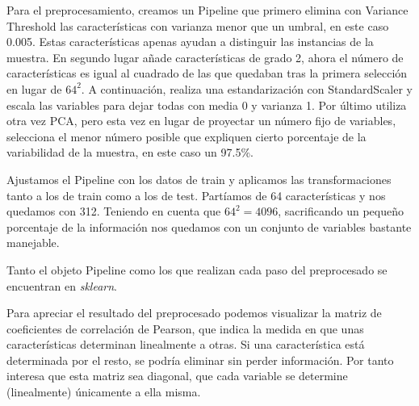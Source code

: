 \documentclass[a4]{article}
\begin{document}
Para el preprocesamiento, creamos un Pipeline que primero elimina con
Variance Threshold las características con varianza menor que un
umbral, en este caso 0.005. Estas características apenas ayudan a
distinguir las instancias de la muestra. En segundo lugar añade
características de grado 2, ahora el número de características es
igual al cuadrado de las que quedaban tras la primera selección en
lugar de $64^2$. A continuación, realiza una estandarización con
StandardScaler y escala las variables para dejar todas con media 0 y
varianza 1. Por último utiliza otra vez PCA, pero esta vez en lugar de
proyectar un número fijo de variables, selecciona el menor número
posible que expliquen cierto porcentaje de la variabilidad de la
muestra, en este caso un 97.5\%.

Ajustamos el Pipeline con los datos de train y aplicamos las
transformaciones tanto a los de train como a los de test. Partíamos de
64 características y nos quedamos con 312. Teniendo en cuenta que
$64^2=4096$, sacrificando un pequeño porcentaje de la información
nos quedamos con un conjunto de variables bastante manejable.

Tanto el objeto Pipeline como los que realizan cada paso del
preprocesado se encuentran en \textit{sklearn}.

Para apreciar el resultado del preprocesado podemos visualizar la
matriz de coeficientes de correlación de Pearson, que indica la medida
en que unas características determinan linealmente a otras. Si una
característica está determinada por el resto, se podría eliminar sin
perder información. Por tanto interesa que esta matriz sea diagonal,
que cada variable se determine (linealmente) únicamente a ella misma.
\end{document}
